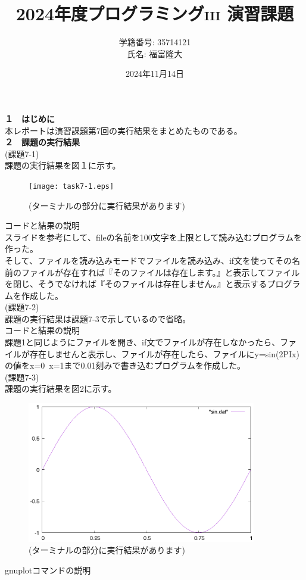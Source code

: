 \documentclass[a4j]{jsarticle}
\title{2024年度プログラミング\textsc{iii} 演習課題}
\author{学籍番号: 35714121 \\ 氏名: 福富隆大}
\date{2024年11月14日}
\begin{document}
\maketitle

\textbf{１　はじめに} \\

本レポートは演習課題第7回の実行結果をまとめたものである。\\

\textbf{２　課題の実行結果} \\

\textmd{(課題7-1)} \\

課題の実行結果を図１に示す。 \\

\begin{figure}[htbp]
  \centering 
  \texttt{[image: task7-1.eps]}
  \caption{(ターミナルの部分に実行結果があります)}
  \label{fig:sample1} %
\end{figure}

\textmd{コードと結果の説明} \\
スライドを参考にして、fileの名前を100文字を上限として読み込むプログラムを作った。\\
そして、ファイルを読み込みモードでファイルを読み込み、if文を使ってその名前のファイルが存在すれば『そのファイルは存在します。』と表示してファイルを閉じ、そうでなければ『そのファイルは存在しません。』と表示するプログラムを作成した。\\

\textmd{(課題7-2)} \\

課題の実行結果は課題7-3で示しているので省略。\\

\textmd{コードと結果の説明} \\
課題1と同じようにファイルを開き、if文でファイルが存在しなかったら、ファイルが存在しませんと表示し、ファイルが存在したら、ファイルにy=sin(2PIx)の値をx=0~x=1まで0.01刻みで書き込むプログラムを作成した。\\

\textmd{(課題7-3)} \\

課題の実行結果を図2に示す。 \\

\begin{figure}[htbp]
  \centering 
  \includegraphics[width=10cm]{sin.eps}
  \caption{(ターミナルの部分に実行結果があります)}
  \label{fig:sample1} %
\end{figure}

\textmd{gnuplotコマンドの説明} \\
\end{document}
